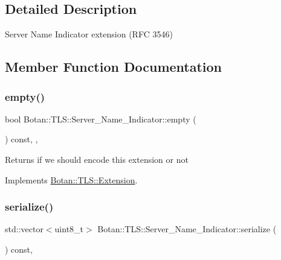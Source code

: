 \subsection{Detailed Description}
Server Name Indicator extension (R\+FC 3546) 

\subsection{Member Function Documentation}
\mbox{\label{class_botan_1_1_t_l_s_1_1_server___name___indicator_a24967daf77707733edc72619984bfb8a}} 
\subsubsection{\texorpdfstring{empty()}{empty()}}
{\footnotesize\ttfamily bool Botan\+::\+T\+L\+S\+::\+Server\+\_\+\+Name\+\_\+\+Indicator\+::empty (\begin{DoxyParamCaption}{ }\end{DoxyParamCaption}) const\hspace{0.3cm}{\ttfamily [inline]}, {\ttfamily [override]}, {\ttfamily [virtual]}}

\begin{DoxyReturn}{Returns}
if we should encode this extension or not 
\end{DoxyReturn}


Implements \hyperlink{class_botan_1_1_t_l_s_1_1_extension_aa850b9be2322f94e7c65e583cd51acc5}{Botan\+::\+T\+L\+S\+::\+Extension}.

\mbox{\label{class_botan_1_1_t_l_s_1_1_server___name___indicator_ad45954f11df924771ad17662637bfc3c}} 
\subsubsection{\texorpdfstring{serialize()}{serialize()}}
{\footnotesize\ttfamily std\+::vector$<$uint8\+\_\+t$>$ Botan\+::\+T\+L\+S\+::\+Server\+\_\+\+Name\+\_\+\+Indicator\+::serialize (\begin{DoxyParamCaption}{ }\end{DoxyParamCaption}) const\hspace{0.3cm}{\ttfamily [override]}, {\ttfamily [virtual]}}

